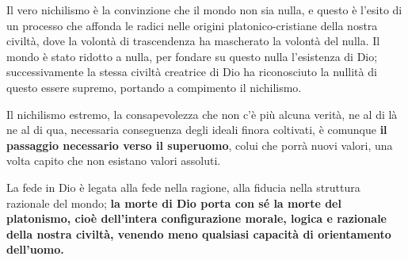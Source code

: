 Il vero nichilismo è la convinzione che il mondo non sia nulla, e questo è l'esito di un processo che affonda le radici nelle origini platonico-cristiane della nostra civiltà, dove la volontà di trascendenza ha mascherato la volontà del nulla. Il mondo è stato ridotto a nulla, per fondare su questo nulla l'esistenza di Dio; successivamente la stessa civiltà creatrice di Dio ha riconosciuto la nullità di questo essere supremo, portando a compimento il nichilismo.

Il nichilismo estremo, la consapevolezza che non c'è più alcuna verità, ne al di là ne al di qua, necessaria conseguenza degli ideali finora coltivati, è comunque \textbf{il passaggio necessario verso il superuomo}, colui che porrà nuovi valori, una volta capito che non esistano valori assoluti.

La fede in Dio è legata alla fede nella ragione, alla fiducia nella struttura razionale del mondo; \textbf{la morte di Dio porta con sé la morte del platonismo, cioè dell'intera configurazione morale, logica e razionale della nostra civiltà, venendo meno qualsiasi capacità di orientamento dell'uomo.}

